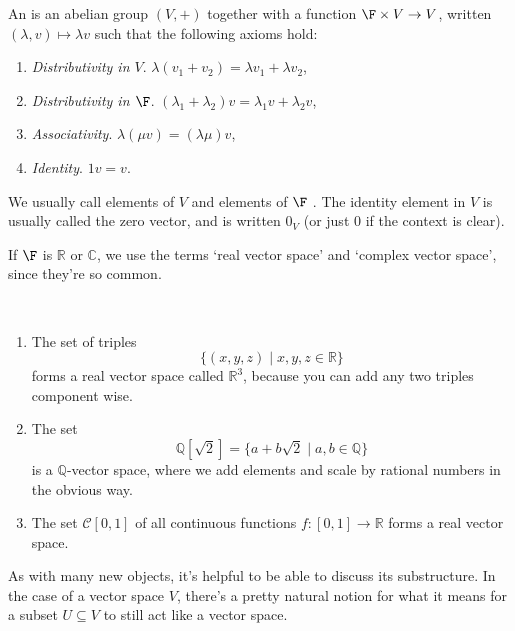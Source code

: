 \documentclass[a4paper]{scrartcl}
\begin{document}
\begin{definition}
    An  is an abelian group $(V, +)$ together with a function $\F \times V \rightarrow V$, written $(\lambda, v) \mapsto \lambda v$ such that the following axioms hold:
    \begin{enumerate}[label=(\roman*)]
        \item \emph{Distributivity in $V$}. $\lambda(v_1 + v_2) = \lambda v_1 + \lambda v_2$,
        \item \emph{Distributivity in $\F$}. $(\lambda_1 + \lambda_2)v = \lambda_1 v + \lambda_2 v$,
        \item \emph{Associativity}. $\lambda(\mu v) = (\lambda \mu) v$,
        \item \emph{Identity}. $1v = v$.
    \end{enumerate} 
\end{definition}

We usually call elements of $V$  and elements of $\F$ . The identity element in $V$ is usually called the zero vector, and is written $0_V$ (or just $0$ if the context is clear).

If $\F$ is $\mathbb{R}$ or $\mathbb{C}$, we use the terms `real vector space' and `complex vector space', since they're so common. 


\begin{example}~
    \vspace{-1.5\baselineskip}
    \begin{enumerate}[label=(\roman*)]
        
        \item The set of triples
        $$
        \{(x, y, z) \mid x, y, z \in \mathbb{R}\}
        $$ 
        forms a real vector space called $\mathbb{R}^3$, because you can add any two triples component wise. 
        \item The set
        $$
        \mathbb{Q}[\sqrt{2}] = \{a + b\sqrt{2} \mid a, b \in \mathbb{Q}\}
        $$
        is a $\mathbb{Q}$-vector space, where we add elements and scale by rational numbers in the obvious way.
        \item The set $\mathcal{C}[0, 1]$ of all continuous functions $f: [0, 1] \rightarrow \mathbb{R}$ forms a real vector space.
    \end{enumerate}
\end{example}

As with many new objects, it's helpful to be able to discuss its substructure. In the case of a vector space $V$, there's a pretty natural notion for what it means for a subset $U \subseteq V$ to still act like a vector space.
\end{document}
